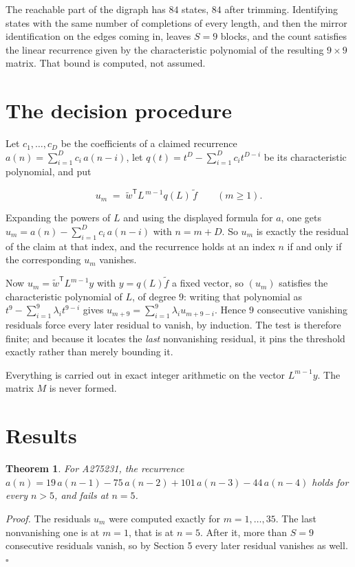 \documentclass[11pt]{article}
\newtheorem{theorem}{Theorem}
\theoremstyle{definition}
\begin{document}
The reachable part of the digraph has $84$ states, $84$ after trimming. Identifying states with the same number of completions of every length, and then the mirror identification on the edges coming in, leaves $S = 9$ blocks, and the count satisfies the linear recurrence given by the characteristic polynomial of the resulting $9\times9$ matrix. That bound is computed, not assumed.

\section{The decision procedure}

Let $c_1,\dots,c_D$ be the coefficients of a claimed recurrence $a(n) = \sum_{i=1}^{D} c_i\,a(n-i)$, let $q(t) = t^{D} - \sum_{i=1}^{D} c_i t^{D-i}$ be its characteristic polynomial, and put

\[u_m \;=\; \tilde w^{\mathsf T} L^{\,m-1} q(L)\,\tilde f \qquad (m \ge 1).\]

Expanding the powers of $L$ and using the displayed formula for $a$, one gets $u_m = a(n) - \sum_{i=1}^{D} c_i\,a(n-i)$ with $n = m + D$. So $u_m$ is exactly the residual of the claim at that index, and the recurrence holds at an index $n$ if and only if the corresponding $u_m$ vanishes.

Now $u_m = \tilde w^{\mathsf T} L^{m-1} y$ with $y = q(L)\tilde f$ a fixed vector, so $(u_m)$ satisfies the characteristic polynomial of $L$, of degree $9$: writing that polynomial as $t^{9} - \sum_{i=1}^{9} \lambda_i t^{9-i}$ gives $u_{m+9} = \sum_{i=1}^{9} \lambda_i u_{m+9-i}$. Hence $9$ consecutive vanishing residuals force every later residual to vanish, by induction. The test is therefore finite; and because it locates the {\itshape last} nonvanishing residual, it pins the threshold exactly rather than merely bounding it.

Everything is carried out in exact integer arithmetic on the vector $L^{m-1}y$. The matrix $M$ is never formed.

\section{Results}

\begin{theorem} For A275231, the recurrence $a(n) = 19\,a(n-1) - 75\,a(n-2) + 101\,a(n-3) - 44\,a(n-4)$ holds for every $n > 5$, and fails at $n = 5$.\end{theorem}

{\itshape Proof.} The residuals $u_m$ were computed exactly for $m = 1,\dots,35$. The last nonvanishing one is at $m = 1$, that is at $n = 5$. After it, more than $S = 9$ consecutive residuals vanish, so by Section 5 every later residual vanishes as well. $\square$
\end{document}
